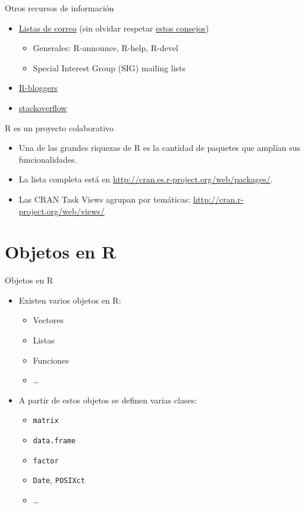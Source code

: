 \documentclass[xcolor={usenames,svgnames,dvipsnames}]{beamer}
\begin{document}
\begin{frame}[label={sec:org23a5824}]{Otros recursos de información}
\begin{itemize}
\item \href{http://www.r-project.org/mail.html}{Listas de correo} (sin olvidar respetar \href{http://www.r-project.org/posting-guide.html}{estos consejos})
\begin{itemize}
\item Generales: R-announce, R-help, R-devel
\item Special Interest Group (SIG) mailing lists
\end{itemize}
\item \href{http://www.r-bloggers.com}{R-bloggers}
\item \href{http://stackoverflow.com/questions/tagged/r}{stackoverflow}
\end{itemize}
\end{frame}

\begin{frame}[label={sec:org06e9b69}]{R es un proyecto colaborativo}
\begin{itemize}
\item Una de las grandes riquezas de R es la cantidad de paquetes que amplían sus funcionalidades.
\item La lista completa está en \url{http://cran.es.r-project.org/web/packages/}.
\item Las CRAN Task Views agrupan por temáticas:
\url{http://cran.r-project.org/web/views/}
\end{itemize}
\end{frame}

\section{Objetos en R}
\label{sec:org4e66d3c}

\begin{frame}[fragile,label={sec:org37b29bf}]{Objetos en R}
 \begin{itemize}
\item Existen varios objetos en R:
\begin{itemize}
\item Vectores
\item Listas
\item Funciones
\item \ldots{}
\end{itemize}
\item A partir de estos objetos se definen varias clases:
\begin{itemize}
\item \texttt{matrix}
\item \texttt{data.frame}
\item \texttt{factor}
\item \texttt{Date}, \texttt{POSIXct}
\item \ldots{}
\end{itemize}
\end{itemize}
\end{frame}
\end{document}
